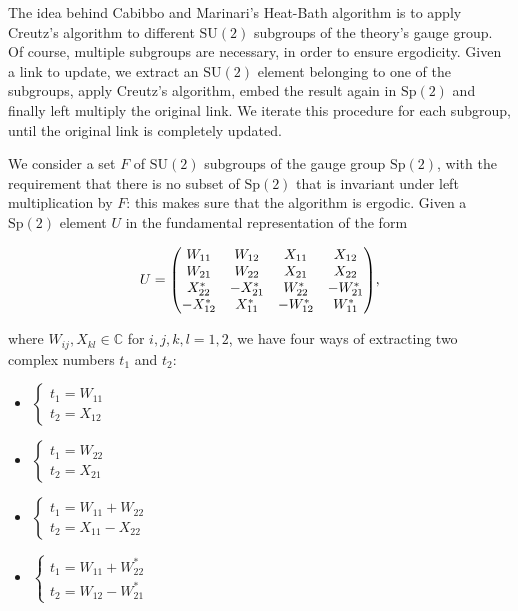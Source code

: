 \documentclass[reqno,12pt]{article}
\numberwithin{equation}{section}
\newcommand{\SU}{\mathrm{SU}}
\newcommand{\Sp}{\mathrm{Sp}}
\begin{document}
The idea behind Cabibbo and Marinari's Heat-Bath algorithm is to apply Creutz's algorithm to different $\SU(2)$
subgroups of the theory's gauge group. Of course, multiple subgroups are necessary, in order to ensure ergodicity.
Given a link to update, we extract an $\SU(2)$ element belonging to one of the subgroups, apply Creutz's algorithm,
embed the result again in $\Sp(2)$ and finally left multiply the original link. We iterate this procedure for each
subgroup, until the original link is completely updated. 


We consider a set $F$ of $\SU(2)$ subgroups of the gauge group $\Sp(2)$, with the requirement that there is no subset of $\Sp(2)$
that is invariant under left multiplication by $F$: this makes sure that the algorithm is ergodic.
Given a $\Sp(2)$ element $U$ in the fundamental representation of the form

\begin{equation}
	U = \mqty(
		W_{11} & W_{12} & X_{11} & X_{12} \\
		W_{21} & W_{22} & X_{21} & X_{22} \\
		X^*_{22} & -X^*_{21} & W^*_{22} & -W^*_{21} \\
		-X^*_{12} & X^*_{11} & -W^*_{12} & W^*_{11}
	),
\end{equation}

where $W_{ij}, X_{kl} \in \mathbb{C}$ for $i,j,k,l = 1, 2$, we have four ways of extracting two complex numbers $t_1$ and $t_2$:

\begin{itemize}
	\item $\begin{cases} t_1 = W_{11} \\ t_2 = X_{12} \end{cases}$
	\item $\begin{cases} t_1 = W_{22} \\ t_2 = X_{21} \end{cases}$
	\item $\begin{cases} t_1 = W_{11} + W_{22} \\ t_2 = X_{11} - X_{22} \end{cases}$
	\item $\begin{cases} t_1 = W_{11} + W^*_{22} \\ t_2 = W_{12} - W^*_{21} \end{cases}$
\end{itemize}
\end{document}
